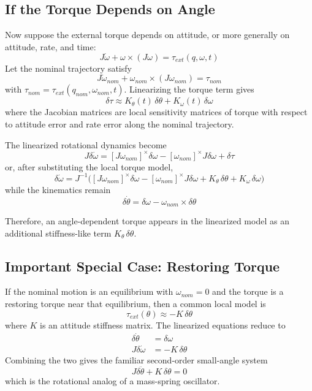 \documentclass[11pt]{article}
\begin{document}
\subsection{If the Torque Depends on Angle}
Now suppose the external torque depends on attitude, or more generally on attitude, rate, and time:
\begin{equation}
    J \dot{\omega} + \omega \times (J\omega) = \tau_{ext}(q, \omega, t)
\end{equation}
Let the nominal trajectory satisfy
\begin{equation}
    J \dot{\omega}_{nom} + \omega_{nom} \times (J\omega_{nom}) = \tau_{nom}
\end{equation}
with $\tau_{nom} = \tau_{ext}(q_{nom}, \omega_{nom}, t)$. Linearizing the torque term gives
\begin{equation}
    \delta\tau \approx K_{\theta}(t) \, \delta\theta + K_{\omega}(t) \, \delta\omega
\end{equation}
where the Jacobian matrices are local sensitivity matrices of torque with respect to attitude error and rate error along the nominal trajectory.

The linearized rotational dynamics become
\begin{equation}
    J\delta\dot{\omega} = [J\omega_{nom}]^\times \delta\omega - [\omega_{nom}]^\times J \delta\omega + \delta\tau
\end{equation}
or, after substituting the local torque model,
\begin{equation}
    \delta\dot{\omega} = J^{-1} \Big( [J\omega_{nom}]^\times \delta\omega - [\omega_{nom}]^\times J \delta\omega + K_{\theta} \, \delta\theta + K_{\omega} \, \delta\omega \Big)
\end{equation}
while the kinematics remain
\begin{equation}
    \delta\dot{\theta} = \delta\omega - \omega_{nom} \times \delta\theta
\end{equation}

Therefore, an angle-dependent torque appears in the linearized model as an additional stiffness-like term $K_{\theta} \, \delta\theta$.

\subsection{Important Special Case: Restoring Torque}
If the nominal motion is an equilibrium with $\omega_{nom} = 0$ and the torque is a restoring torque near that equilibrium, then a common local model is
\begin{equation}
    \tau_{ext}(\theta) \approx -K \, \delta\theta
\end{equation}
where $K$ is an attitude stiffness matrix. The linearized equations reduce to
\begin{align}
    \delta\dot{\theta} &= \delta\omega \\
    J\delta\dot{\omega} &= -K \, \delta\theta
\end{align}
Combining the two gives the familiar second-order small-angle system
\begin{equation}
    J \delta\ddot{\theta} + K \, \delta\theta = 0
\end{equation}
which is the rotational analog of a mass-spring oscillator.
\end{document}
